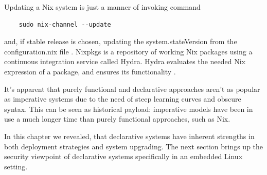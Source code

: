 Updating a Nix system is just a manner of invoking command

\begin{lstlisting}
    sudo nix-channel --update
\end{lstlisting}

and, if stable release is chosen, updating the system.stateVersion
from the configuration.nix file \cite{nixosNixOSManual}. Nixpkgs is a
repository of working Nix packages using a continuous integration
service called Hydra. Hydra evaluates the needed Nix expression of a
package, and ensures its functionality \cite{nixosNixOSManual}.

It's apparent that purely functional and declarative approaches aren't as popular
as imperative systems due to the need of steep learning curves and
obscure syntax. This can be seen as historical payload: imperative
models have been in use a much longer time than purely functional
approaches, such as Nix.

In this chapter we revealed, that declarative systems have inherent
strengths in both deployment strategies and system upgrading. The next
section brings up the security viewpoint of declarative systems
specifically in an embedded Linux setting.
